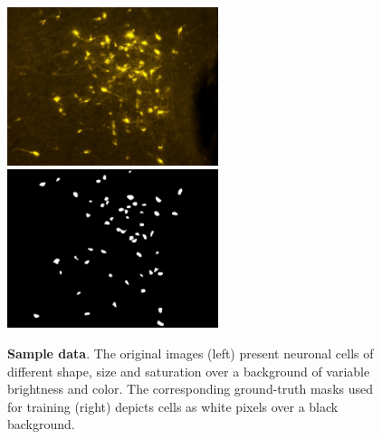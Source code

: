 \begin{figure}
{}
\centerline{
\includegraphics[width=0.55\textwidth]{figures/120_dataset/i_257.jpeg}
\includegraphics[width=0.55\textwidth]{figures/120_dataset/m_257.jpeg}
}
\label{fig:dataset}
\caption{
\textbf{Sample data}. The original images (left) present neuronal cells of different shape, size and saturation over a background of variable brightness and color.
The corresponding ground-truth masks used for training (right) depicts cells as white pixels over a black background.
} \end{figure}%
